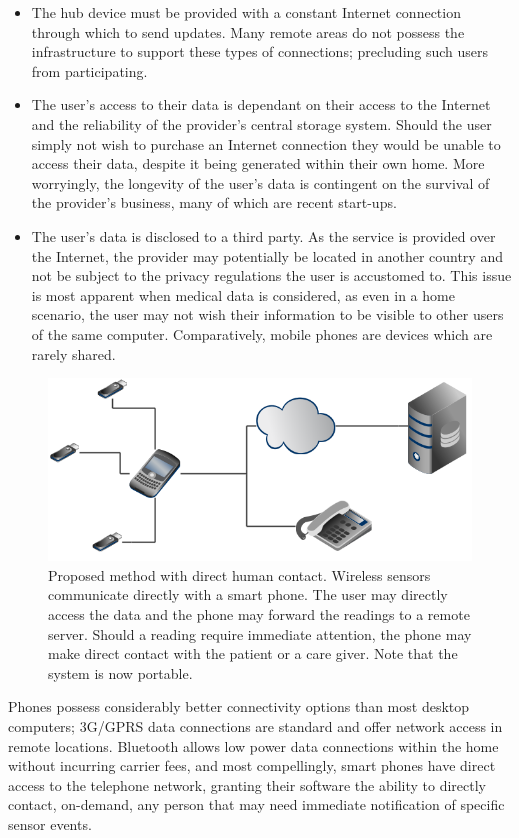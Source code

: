 \documentclass[conference,a4paper]{IEEEtran}
\begin{document}
\begin{itemize}
\item The hub device must be provided with a constant Internet connection through which to send updates.
Many remote areas do not possess the infrastructure to support these types of connections; precluding such users from participating.
\item
The user's access to their data is dependant on their access to the Internet and the reliability of the provider's central storage system.
Should the user simply not wish to purchase an Internet connection they would be unable to access their data, despite it being generated within their own home.
More worryingly, the longevity of the user's data is contingent on the survival of the provider's business, many of which are recent start-ups.
\item
The user's data is disclosed to a third party. As the service is provided over the Internet, the provider may potentially be located in another country and not be subject to the privacy regulations the user is accustomed to.
This issue is most apparent when medical data is considered, as even in a home scenario, the user may not wish their information to be visible to other users of the same computer.
Comparatively, mobile phones are devices which are rarely shared.
\end{itemize}


\begin{figure}
\centering
\includegraphics[scale=0.27]{./figures/propFlow.png}
\caption{Proposed method with direct human contact. Wireless sensors communicate directly with a smart phone. The user may directly access the data and the phone may forward the readings to a remote server. Should a reading require immediate attention, the phone may make direct contact with the patient or a care giver. Note that the system is now portable.}
\label{figPropFlow}
\end{figure}

Phones possess considerably better connectivity options than most desktop computers; 3G/GPRS data connections are standard and offer network access in remote locations. Bluetooth allows low power data connections within the home without incurring carrier fees, and most compellingly, smart phones have direct access to the telephone network, granting their software the ability to directly contact, on-demand, any person that may need immediate notification of specific sensor events.
\end{document}

